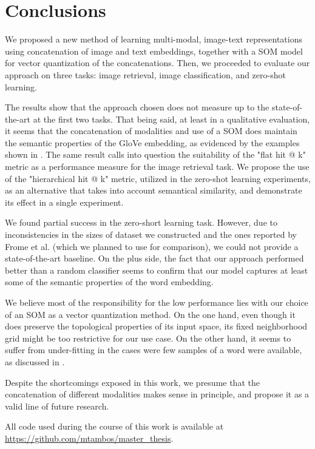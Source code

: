 \documentclass[bibtotoc,liststotoc,BCOR5mm,DIV12s]{standalone}
\begin{document}
\chapter{Conclusions}\label{chap:conclusions}

We proposed a new method of learning multi-modal, image-text representations using concatenation of image and text embeddings, together with a SOM model for vector quantization of the concatenations. Then, we proceeded to evaluate our approach on three tasks: image retrieval, image classification, and zero-shot learning.

The results show that the approach chosen does not measure up to the state-of-the-art at the first two tasks. That being said, at least in a qualitative evaluation, it seems that the concatenation of modalities and use of a SOM does maintain the semantic properties of the GloVe embedding, as evidenced by the examples shown in . The same result calls into question the suitability of the "flat hit @ k" metric as a performance measure for the image retrieval task. We propose the use of the "hierarchical hit @ k" metric, utilized in the zero-shot learning experiments, as an alternative that takes into account semantical similarity, and demonstrate its effect in a single experiment.

We found partial success in the zero-short learning task. However, due to inconsistencies in the sizes of dataset we constructed and the ones reported by Frome et al. (which we planned to use for comparison), we could not provide a state-of-the-art baseline. On the plus side, the fact that our approach performed better than a random classifier seems to confirm that our model captures at least some of the semantic properties of the word embedding.

We believe most of the responsibility for the low performance lies with our choice of an SOM as a vector quantization method. On the one hand, even though it does preserve the topological properties of its input space, its fixed neighborhood grid might be too restrictive for our use case. On the other hand, it seems to suffer from under-fitting in the cases were few samples of a word were available, as discussed in .

Despite the shortcomings exposed in this work, we presume that the concatenation of different modalities makes sense in principle, and propose it as a valid line of future research.

All code used during the course of this work is available at \url{https://github.com/mtambos/master_thesis}.
\end{document}

